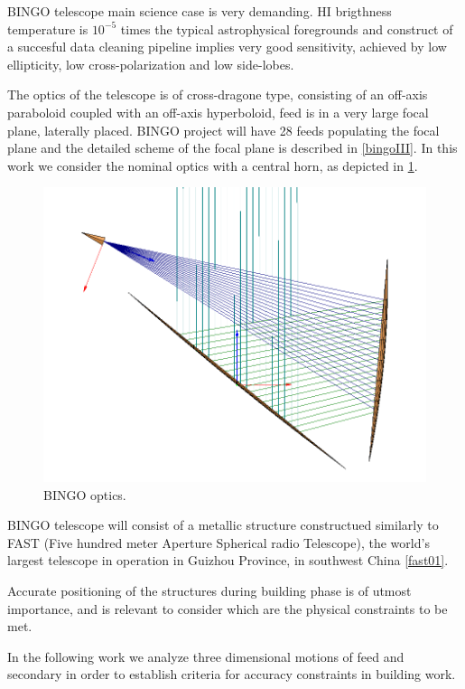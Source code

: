 \documentclass{ws-jai}
\begin{document}
BINGO telescope main science case is very demanding. HI brigthness temperature is $10^{-5}$ times the typical astrophysical foregrounds and construct of a succesful data cleaning pipeline implies very good sensitivity, achieved by low ellipticity, low cross-polarization and low side-lobes.

The optics of the telescope is of cross-dragone type, consisting of an off-axis paraboloid coupled with an off-axis hyperboloid, feed is in a very large focal plane, laterally placed. BINGO project will have 28 feeds populating the focal plane and the detailed scheme of the focal plane is described in \ref{bingoIII}. In this work we consider the nominal optics with a central horn, as depicted in \ref{fig:bingo_optics}.

\begin{figure}
\begin{center}
\includegraphics[width=7in]{./figs/GRASP_VIEW}
\end{center}
\caption{BINGO optics.}
\label{fig:bingo_optics}
\end{figure}


BINGO telescope will consist of a metallic structure constructued similarly to FAST (Five hundred meter Aperture Spherical radio Telescope), the world's largest telescope in operation in Guizhou Province, in southwest China \ref{fast01}.

Accurate positioning of the structures during building phase is of utmost importance, and is relevant to consider which are the physical constraints to be met.

In the following work we analyze three dimensional motions of feed and secondary in order to establish criteria for accuracy constraints in building work.
\end{document}
